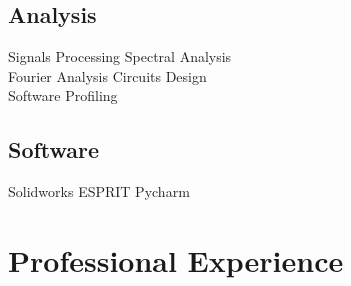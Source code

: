 \documentclass[letterpaper]{deedy-resume} %
\begin{document}
\begin{minipage}[t]{0.33\textwidth}
 \subsection{Analysis}
 Signals Processing \textbullet{} Spectral Analysis \\
Fourier Analysis \textbullet{} Circuits Design \\
Software Profiling

 \subsection{Software}
 Solidworks \textbullet{} ESPRIT \textbullet{} Pycharm

 \sectionspace %

\end{minipage}
\hfill
\begin{minipage}[t]{0.66\textwidth}



\section{Professional Experience}




\end{minipage}
\end{document}
